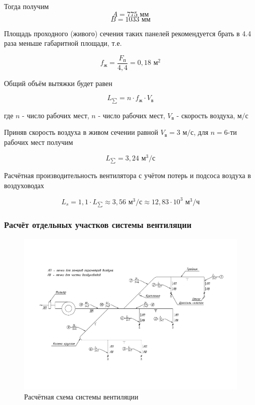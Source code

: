 Тогда получим
$$
    A = 775 \text{ мм}
$$
$$
    B = 1033 \text{ мм}
$$


Площадь проходного (живого) сечения таких панелей рекомендуется брать в 4.4
раза меньше габаритной площади, т.е.

\begin{equation}
\label{alive_section_are}
    f_\text{ж} = \frac{F_\text{п}}{4,4} = 0,18 \text{ м}^2
\end{equation}

Общий объём вытяжки будет равен

\begin{equation}
\label{overall_sucktion_volume}
    L_{\sum} = n \cdot f_\text{ж} \cdot V_\text{в}
\end{equation}

где $n$ - число рабочих мест,
$n$ - число рабочих мест,
$V_\text{в}$ - скорость воздуха, $\text{м/с}$

Приняв скорость воздуха в живом сечении равной $V_\text{в} = 3 \text{ м/с}$,
для $n = 6$-ти рабочих мест получим

$$
    L_{\sum} = 3,24 \text{ м}^3 / \text{с}
$$

Расчётная производительность вентилятора с учётом потерь и подсоса воздуха
в воздуховодах

\begin{equation}
\label{fan_productivity}
    L_s = 1,1 \cdot L_{\sum}
        \approx 3,56 \text{ м}^3 / \text{с}
        \approx 12,83 \cdot 10^3 \text{ м}^3 / \text{ч}
\end{equation}

\subsubsection{Расчёт отдельных участков системы вентиляции}

\begin{figure}[ht]
    \centering
    \includegraphics[width=\textwidth, keepaspectratio, clip=true, trim=0mm 35mm 0mm 40mm]
                    {./src/ecology/pictures/vent_system_arrangement}
    \caption{Расчётная схема системы вентиляции}
    \label{pic_vent_system_arrangement}
\end{figure}


